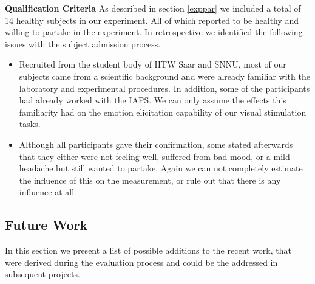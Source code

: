\textbf{Qualification Criteria}
As described in section \ref{exppar} we included a total of 14 healthy subjects in our experiment. All of which reported to be healthy and willing to partake in the experiment. In retrospective we identified the following issues with the subject admission process.
\begin{itemize}
\item Recruited from the student body of HTW Saar and SNNU, most of our subjects came from a scientific background and were already familiar with the laboratory and experimental procedures. In addition, some of the participants had already worked with the IAPS. We can only assume the effects this familiarity had on the emotion elicitation capability of our visual stimulation tasks.
\item Although all participants gave their confirmation, some stated afterwards that they either were not feeling well, suffered from bad mood, or a mild headache but still wanted to partake. Again we can not completely estimate the influence of this on the measurement, or rule out that there is any influence at all
\end{itemize}
 


\subsection{Future Work}
In this section we present a list of possible additions to the recent work, that were derived during the evaluation process and could be the addressed in subsequent projects.

